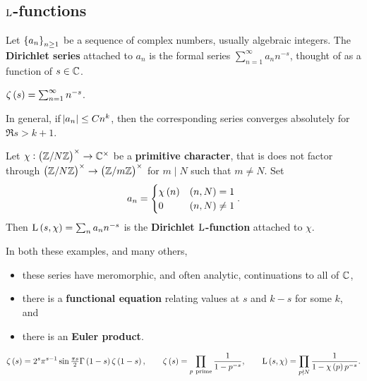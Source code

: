 \pagebreak

\subsection{\texorpdfstring{$ \mathrm{L} $}{L}-functions}

\begin{definition}
Let $ \cbr{a_n}_{n \ge 1} $ be a sequence of complex numbers, usually algebraic integers. The \textbf{Dirichlet series} attached to $ a_n $ is the formal series $ \sum_{n = 1}^\infty a_nn^{-s} $, thought of as a function of $ s \in \mathbb{C} $.
\end{definition}

\begin{example*}
$ \zeta\br{s} = \sum_{n = 1}^\infty n^{-s} $.
\end{example*}

In general, if $ \abs{a_n} \le Cn^k $, then the corresponding series converges absolutely for $ \Re s > k + 1 $.

\begin{example*}
Let $ \chi : \br{\ZZ / N\ZZ}^\times \to \CC^\times $ be a \textbf{primitive character}, that is does not factor through $ \br{\ZZ / N\ZZ}^\times \to \br{\ZZ / m\ZZ}^\times $ for $ m \mid N $ such that $ m \ne N $. Set
$$ a_n =
\begin{cases}
\chi\br{n} & \br{n, N} = 1 \\
0 & \br{n, N} \ne 1
\end{cases}.
$$
Then $ \L\br{s, \chi} = \sum_n a_nn^{-s} $ is the \textbf{Dirichlet $ \mathrm{L} $-function} attached to $ \chi $.
\end{example*}

In both these examples, and many others,
\begin{itemize}
\item these series have meromorphic, and often analytic, continuations to all of $ \mathbb{C} $,
\item there is a \textbf{functional equation} relating values at $ s $ and $ k - s $ for some $ k $, and
\item there is an \textbf{Euler product}.
\end{itemize}

\begin{example*}
$$ \zeta\br{s} = 2^s\pi^{s - 1}\sin \tfrac{\pi s}{2}\Gamma\br{1 - s}\zeta\br{1 - s}, \qquad \zeta\br{s} = \prod_{p \ \text{prime}} \dfrac{1}{1 - p^{-s}}, \qquad \L\br{s, \chi} = \prod_{p \nmid N} \dfrac{1}{1 - \chi\br{p}p^{-s}}. $$
\end{example*}

